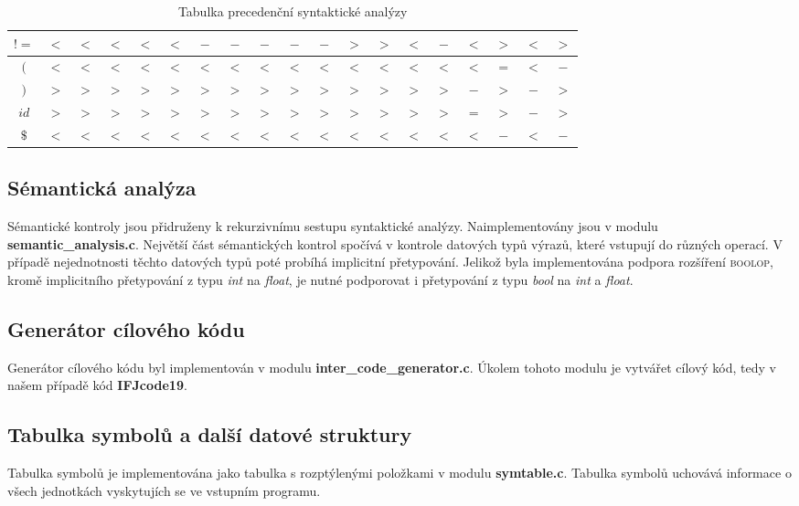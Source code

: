 \documentclass[12pt]{article}
\begin{document}
\begin{table}[!htbp]
\begin{tabular}{|c|c|c|c|c|c|c|c|c|c|c|c|c|c|c|c|c|c|c|}
    \hline
        $!=$ & $<$ & $<$ & $<$ & $<$ & $<$ & $-$ & $-$ & $-$ & $-$ & $-$ & $>$ & $>$ & $<$ & $-$ & $<$ & $>$ & $<$ & $>$\\
    \hline
        $($ & $<$ & $<$ & $<$ & $<$ & $<$ & $<$ & $<$ & $<$ & $<$ & $<$ & $<$ & $<$ & $<$ & $<$ & $<$ & $=$ & $<$ & $-$\\
    \hline
        $)$ & $>$ & $>$ & $>$ & $>$ & $>$ & $>$ & $>$ & $>$ & $>$ & $>$ & $>$ & $>$ & $>$ & $>$ & $-$ & $>$ & $-$ & $>$\\
    \hline
        $id$ & $>$ & $>$ & $>$ & $>$ & $>$ & $>$ & $>$ & $>$ & $>$ & $>$ & $>$ & $>$ & $>$ & $>$ & $=$ & $>$ & $-$ & $>$\\
    \hline
        $\$$ & $<$ & $<$ & $<$ & $<$ & $<$ & $<$ & $<$ & $<$ & $<$ & $<$ & $<$ & $<$ & $<$ & $<$ & $<$ & $-$ & $<$ & $-$\\
    \hline
    \end{tabular}
    \caption{Tabulka precedenční syntaktické analýzy}
    \label{tab:3}
\end{table}

\subsection{Sémantická analýza}
Sémantické kontroly jsou přidruženy k rekurzivnímu sestupu syntaktické analýzy.
Naimplementovány jsou v modulu \textbf{semantic\_analysis.c}. Největší část sémantických kontrol spočívá v kontrole datových typů výrazů, které vstupují do různých operací. V případě nejednotnosti těchto datových typů poté probíhá implicitní přetypování. Jelikož byla implementována podpora rozšíření \textsc{boolop}, kromě implicitního přetypování z typu \emph{int} na \emph{float}, je nutné podporovat i přetypování z typu \emph{bool} na \emph{int} a \emph{float}.

\subsection{Generátor cílového kódu}
Generátor cílového kódu byl implementován v modulu \textbf{inter\_code\_generator.c}. Úkolem tohoto modulu je vytvářet cílový kód, tedy v našem případě kód \textbf{IFJcode19}.

\subsection{Tabulka symbolů a další datové struktury}
Tabulka symbolů je implementována jako tabulka s rozptýlenými položkami v modulu \textbf{symtable.c}. Tabulka symbolů uchovává informace o všech jednotkách vyskytujích se ve vstupním programu. 
\end{document}
